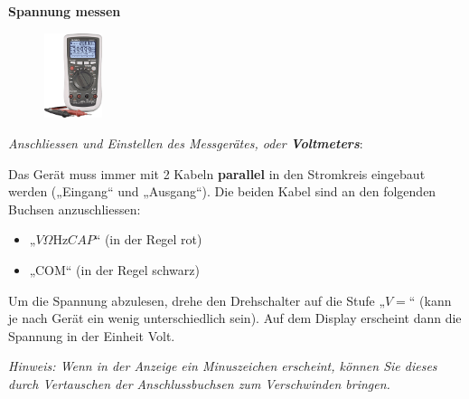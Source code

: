 \documentclass[11pt]{article}
\begin{document}
\begin{tcolorbox}[width=\textwidth, %
    colback=white,colframe=gray!75!black]

\textbf{Spannung messen}

\vspace{0.2cm}

\begin{figure}
\vspace{-12pt}
  \centering
    \includegraphics[width=0.15\textwidth]{images/multimeter-vc-870.png}
\end{figure}

\textit{Anschliessen und Einstellen des Messgerätes, oder \textbf{Voltmeters}}:


Das Gerät muss immer mit 2 Kabeln \textbf{parallel} in den Stromkreis eingebaut werden („Eingang“ und  „Ausgang“). 
Die beiden Kabel sind an den folgenden Buchsen anzuschliessen:

\begin{itemize}[label={--}]
    \item „$V\Omega \si{\hertz}CAP$“   (in der Regel rot)
    \item „COM“  (in der Regel schwarz)
\end{itemize}

Um die Spannung abzulesen, drehe den Drehschalter auf die Stufe „$V=$“ (kann je nach Gerät ein wenig unterschiedlich sein). Auf dem Display erscheint dann die Spannung in der Einheit Volt.


\textit{Hinweis: Wenn in der Anzeige ein Minuszeichen erscheint, können Sie dieses durch Vertauschen der Anschlussbuchsen zum Verschwinden bringen.}
\end{tcolorbox}
\end{document}
